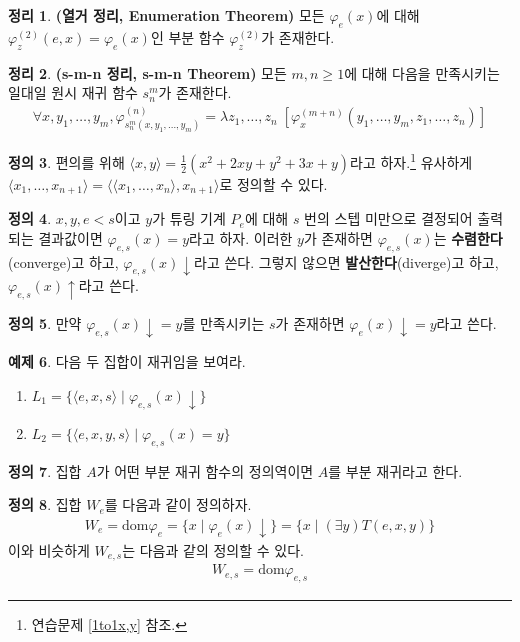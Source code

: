 \documentclass[b5paper, 11pt]{book}
\theoremstyle{definition}
\newtheorem{defn}{정의}[chapter]
\newtheorem{thm}[defn]{정리}
\newtheorem{ex}[defn]{예제}
\begin{document}
\begin{thm}
    \textbf{(열거 정리, Enumeration Theorem)} 
    모든 $\varphi_e (x)$에 대해 $\varphi_z^{(2)} (e, x) = \varphi_e (x)$인 부분 함수 $\varphi_z^{(2)}$가 존재한다.
\end{thm}
\begin{thm}
    \textbf{(s-m-n 정리, s-m-n Theorem)} 모든 $m, n \ge 1$에 대해 다음을 만족시키는 일대일 원시 재귀 함수 $s_n^m$가 존재한다. 
    \begin{align*}
        \forall x, y_1, \ldots, y_m, \varphi^{(n)}_{s_n^m (x, y_1, \ldots, y_m)} = \lambda z_1, \ldots, z_n \; [\varphi_x^{(m+n)} (y_1, \ldots, y_m, z_1, \ldots, z_n)]
    \end{align*} 
\end{thm}
\begin{defn}
    편의를 위해 $\langle x, y \rangle =  \frac{1}{2}(x^2 + 2xy + y^2 + 3x + y)$라고 하자.\footnote{연습문제 \ref{1to1x,y} 참조.} 유사하게 $ \langle x_1, \ldots, x_{n+1} \rangle = \langle \langle x_1 , \ldots, x_n \rangle,  x_{n+1} \rangle$로 정의할 수 있다. 
\end{defn}
\begin{defn}
    $x, y, e < s$이고 $y$가 튜링 기계 $P_e$에 대해 $s$ 번의 스텝 미만으로 결정되어 출력되는 결과값이면 $\varphi_{e, s} (x) = y$라고 하자. 이러한 $y$가 존재하면 $\varphi_{e,s} (x)$는 \textbf{수렴한다}(converge)고 하고, $\varphi_{e, s} (x)\downarrow$라고 쓴다. 그렇지 않으면 \textbf{발산한다}(diverge)고 하고, $\varphi_{e, s} (x) \uparrow$라고 쓴다.
\end{defn}
\begin{defn}
    만약 $\varphi_{e, s} (x) \downarrow = y$를 만족시키는 $s$가 존재하면 $\varphi_e (x) \downarrow = y$라고 쓴다.
\end{defn}
\begin{ex}
    다음 두 집합이 재귀임을 보여라.
    \begin{enumerate}
        \item $L_1 = \{\langle e, x, s\rangle \;\vert\; \varphi_{e, s} (x) \downarrow \}$
        \item $L_2 = \{ \langle e, x, y, s \rangle \;\vert\; \varphi_{e, s} (x) = y\}$
    \end{enumerate}
\end{ex}
\begin{defn}
    집합 $A$가 어떤 부분 재귀 함수의 정의역이면 $A$를 부분 재귀라고 한다.
\end{defn}
\begin{defn}    
    집합 $W_e$를 다음과 같이 정의하자.
    \begin{align*}
        W_e = \text{dom} \varphi_e = \{x \;\vert\; \varphi_e (x) \downarrow\} = \{x \;\vert\; (\exists y) T(e,x,y)\}
    \end{align*}
    이와 비슷하게 $W_{e,s}$는 다음과 같의 정의할 수 있다.
    \begin{align*}
        W_{e,s} = \text{dom}\varphi_{e,s}
    \end{align*}
\end{defn}
\end{document}
